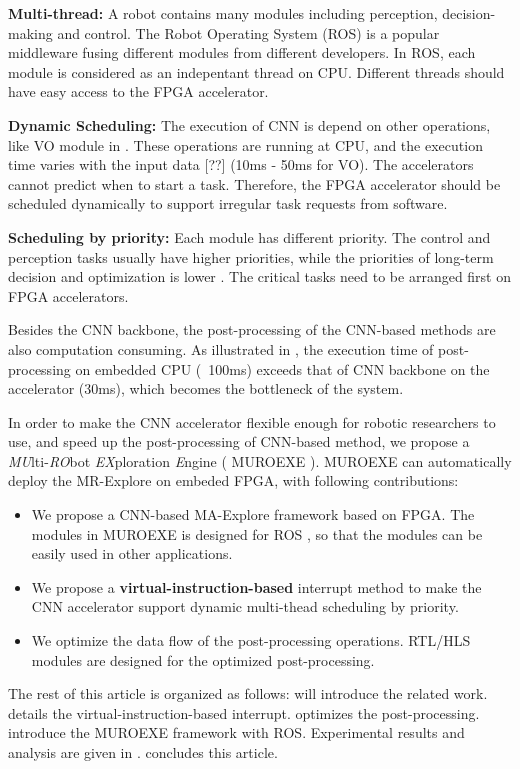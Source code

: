 \textbf{Multi-thread:} A robot contains many modules including perception, decision-making and control. 
The Robot Operating System (ROS) \cite{quigley2009ros} is a popular middleware fusing different modules from different developers. 
In ROS, each module is considered as an indepentant thread on CPU. 
Different threads should have easy access to the FPGA accelerator.

\textbf{Dynamic Scheduling:} The execution of CNN is depend on other operations, like VO module in . 
These operations are running at CPU, and the execution time varies with the input data [??] (10ms - 50ms for VO). 
The accelerators cannot predict when to start a task. 
Therefore, the FPGA accelerator should be scheduled dynamically to support irregular task requests from software.

\textbf{Scheduling by priority:} Each module has different priority. The control and perception tasks usually have higher priorities, while the priorities of long-term decision and optimization is lower \cite{RamsauerKLM17}. The critical tasks need to be arranged first on FPGA accelerators.

Besides the CNN backbone, the post-processing of the CNN-based methods are also computation consuming. As illustrated in , the execution time of post-processing on embedded CPU (~100ms) exceeds that of CNN backbone on the accelerator (30ms), which becomes the bottleneck of the system.


In order to make the CNN accelerator flexible enough for robotic researchers to use, and speed up the post-processing of CNN-based method, we propose a \textit{MU}lti-\textit{RO}bot \textit{EX}ploration \textit{E}ngine ( MUROEXE ). MUROEXE can automatically deploy the MR-Explore on embeded FPGA, with following contributions:

\begin{itemize}[leftmargin = 10 pt]
\item We propose a CNN-based MA-Explore framework based on FPGA. The modules in MUROEXE is designed for ROS \cite{quigley2009ros}, so that the modules can be easily used in other applications.
\item We propose a \textbf{virtual-instruction-based} interrupt method to make the CNN accelerator support dynamic multi-thead scheduling by priority.
\item We optimize the data flow of the post-processing operations. RTL/HLS modules are designed for the optimized post-processing.
\end{itemize}

The rest of this article is organized as follows:  will introduce the related work.  details the {virtual-instruction-based} interrupt.  optimizes the post-processing.  introduce the MUROEXE framework with ROS. Experimental results and analysis are given in .  concludes this article.